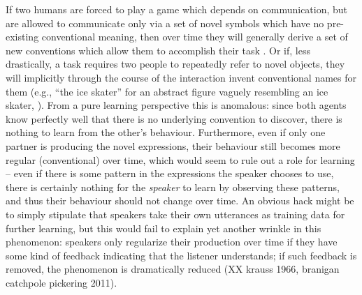 \documentclass{article} %
\begin{document}
If two humans are forced to play a game which depends on communication, but are allowed to communicate only via a set of novel symbols which have no pre-existing conventional meaning, then over time they will generally derive a set of new conventions which allow them to accomplish their task \cite{galantucci2005}. Or if, less drastically, a task requires two people to repeatedly refer to novel objects, they will implicitly through the course of the interaction invent conventional names for them (e.g., ``the ice skater'' for an abstract figure vaguely resembling an ice skater, \cite{clark1986}). From a pure learning perspective this is anomalous: since both agents know perfectly well that there is no underlying convention to discover, there is nothing to learn from the other's behaviour. Furthermore, even if only one partner is producing the novel expressions, their behaviour still becomes more regular (conventional) over time, which would seem to rule out a role for learning -- even if there is some pattern in the expressions the speaker chooses to use, there is certainly nothing for the \textit{speaker} to learn by observing these patterns, and thus their behaviour should not change over time. An obvious hack might be to simply stipulate that speakers take their own utterances as training data for further learning, but this would fail to explain yet another wrinkle in this phenomenon: speakers only regularize their production over time if they have some kind of feedback indicating that the listener understands; if such feedback is removed, the phenomenon is dramatically reduced (XX krauss 1966, branigan catchpole pickering 2011).
\end{document}
